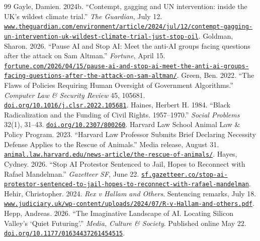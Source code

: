 \documentclass[11pt]{article}
\begin{document}
\begin{thebibliography}{99}
 Gayle, Damien. 2024b. ``Contempt, gagging and UN intervention: inside the UK's wildest climate trial.'' \emph{The Guardian}, July 12. \href{https://www.theguardian.com/environment/article/2024/jul/12/contempt-gagging-un-intervention-uk-wildest-climate-trial-just-stop-oil}{\nolinkurl{www.theguardian.com/environment/article/2024/jul/12/contempt-gagging-un-intervention-uk-wildest-climate-trial-just-stop-oil}}.
 Goldman, Sharon. 2026. ``Pause AI and Stop AI: Meet the anti-AI groups facing questions after the attack on Sam Altman.'' \emph{Fortune}, April 15. \href{https://fortune.com/2026/04/15/pause-ai-and-stop-ai-meet-the-anti-ai-groups-facing-questions-after-the-attack-on-sam-altman/}{\nolinkurl{fortune.com/2026/04/15/pause-ai-and-stop-ai-meet-the-anti-ai-groups-facing-questions-after-the-attack-on-sam-altman/}}.
 Green, Ben. 2022. ``The Flaws of Policies Requiring Human Oversight of Government Algorithms.'' \emph{Computer Law \& Security Review} 45, 105681. \href{https://doi.org/10.1016/j.clsr.2022.105681}{\nolinkurl{doi.org/10.1016/j.clsr.2022.105681}}.
 Haines, Herbert H. 1984. ``Black Radicalization and the Funding of Civil Rights.  1957--1970.'' \emph{Social Problems} 32(1), 31--43. \href{https://doi.org/10.2307/800260}{\nolinkurl{doi.org/10.2307/800260}}.
 Harvard Law School Animal Law \& Policy Program. 2023. ``Harvard Law Professor Submits Brief Declaring Necessity Defense Applies to the Rescue of Animals.'' Media release, August 31. \href{https://animal.law.harvard.edu/news-article/the-rescue-of-animals/}{\nolinkurl{animal.law.harvard.edu/news-article/the-rescue-of-animals/}}.
 Hayes, Cydney. 2026. ``Stop AI Protestor Sentenced to Jail, Hopes to Reconnect with Rafael Mandelman.'' \emph{Gazetteer SF}, June 22. \href{https://sf.gazetteer.co/stop-ai-protestor-sentenced-to-jail-hopes-to-reconnect-with-rafael-mandelman}{\nolinkurl{sf.gazetteer.co/stop-ai-protestor-sentenced-to-jail-hopes-to-reconnect-with-rafael-mandelman}}.
 Hehir, Christopher. 2024. \emph{Rex v Hallam and Others}. Sentencing remarks, July 18. \href{https://www.judiciary.uk/wp-content/uploads/2024/07/R-v-Hallam-and-others.pdf}{\nolinkurl{www.judiciary.uk/wp-content/uploads/2024/07/R-v-Hallam-and-others.pdf}}.
 Hepp, Andreas. 2026. ``The Imaginative Landscape of AI.  Locating Silicon Valley's `Quiet Futuring'.'' \emph{Media, Culture \& Society}. Published online May 22. \href{https://doi.org/10.1177/01634437261454515}{\nolinkurl{doi.org/10.1177/01634437261454515}}.

\end{thebibliography}
\end{document}
